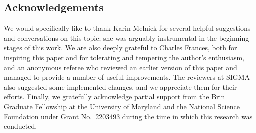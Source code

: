 \documentclass[pdftex]{sigma}
\numberwithin{equation}{section}
\theoremstyle{definition}
\begin{document}
\subsection*{Acknowledgements}
We would specifically like to thank Karin Melnick for several helpful suggestions and conversations on this topic; she was arguably instrumental in the beginning stages of this work. We are also deeply grateful to Charles Frances, both for inspiring this paper and for tolerating and tempering the author's enthusiasm, and an anonymous referee who reviewed an earlier version of this paper and managed to provide a number of useful improvements. The reviewers at SIGMA also suggested some implemented changes, and we appreciate them for their efforts. Finally, we gratefully acknowledge partial support from the Brin Graduate Fellowship at the University of Maryland and the National Science Foundation under Grant No.\ 2203493 during the time in which this research was conducted.
\end{document}
